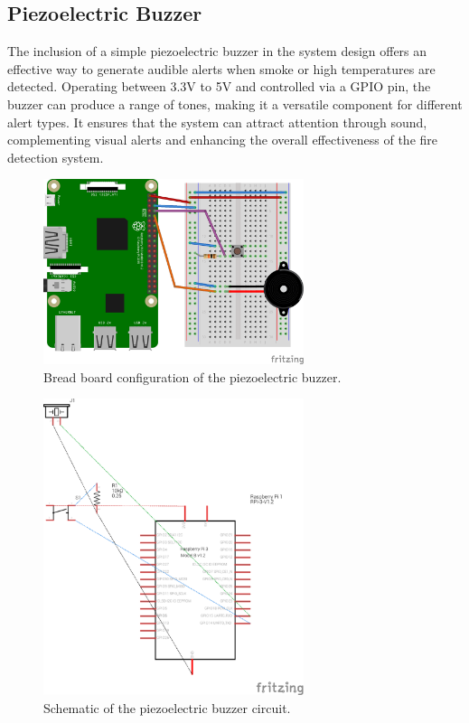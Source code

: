\subsection{Piezoelectric Buzzer}

The inclusion of a simple piezoelectric buzzer in the system design offers an effective way to generate audible alerts
when smoke or high temperatures are detected. Operating between 3.3V to 5V and controlled via a GPIO pin, the buzzer
can produce a range of tones, making it a versatile component for different alert types. It ensures that the system can
attract attention through sound, complementing visual alerts and enhancing the overall effectiveness of the fire
detection system.

\begin{figure}[H]
    \centering
    \includegraphics[width=3in]{../assets/schematics/BuzzerBB.png}
    \caption{Bread board configuration of the piezoelectric buzzer.}
\end{figure}

\begin{figure}[H]
    \centering
    \includegraphics[width=3in]{../assets/schematics/BuzzerSchema.png}
    \caption{Schematic of the piezoelectric buzzer circuit.}
\end{figure}

